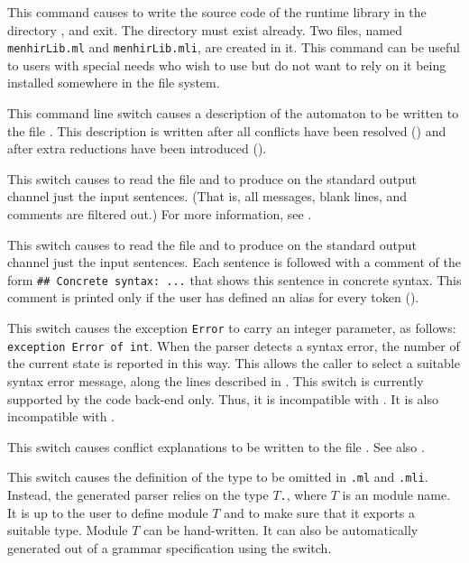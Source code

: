 \documentclass[onecolumn,11pt,nocopyrightspace,preprint]{sigplanconf}
\begin{document}
 This command causes \menhir to
write the source code of the runtime library \menhirlib in the directory
, and exit. The directory  must exist already. Two
files, named \texttt{menhirLib.ml} and \texttt{menhirLib.mli}, are created in
it. This command can be useful to users with special needs who wish to use
\menhirlib but do not want to rely on it being installed somewhere in the file
system.

\docswitch{\odumpresolved} This command line switch causes a description of
the automaton to be written to the file \automatonresolved. This
description is written after all conflicts have been resolved
() and after extra reductions have been introduced
().

 This switch causes \menhir to
read the \messages file  and to produce on the standard output
channel just the input sentences. (That is, all messages, blank lines, and
comments are filtered out.) For more information, see .

 This switch causes \menhir to
read the \messages file  and to produce on the standard output
channel just the input sentences. Each sentence is followed with a comment of
the form \verb+## Concrete syntax: ...+ that shows this sentence in concrete
syntax. This comment is printed only if the user has defined an alias for
every token ().

\docswitch{\oexncarriesstate} This switch causes the exception \texttt{Error}
to carry an integer parameter, as follows: \texttt{exception Error of int}.
When the parser detects a syntax error, the number of the current state is
reported in this way. This allows the caller to select a suitable syntax error
message, along the lines described in . This switch is
currently supported by the code back-end only. Thus, it is incompatible
with \otable. It is also incompatible with \ofixedexc.

\docswitch{\oexplain} This switch causes conflict explanations to be
written  to the file \conflicts. See also .

 This switch causes the definition of
the \token type to be omitted in \texttt{.ml} and
\texttt{.mli}. Instead, the generated parser relies on
the type $T$\texttt{.}\token, where $T$ is an \ocaml module name. It is up to
the user to define module $T$ and to make sure that it exports a suitable
\token type. Module $T$ can be hand-written. It can also be automatically generated
out of a grammar specification using the \oonlytokens switch.
\end{document}
